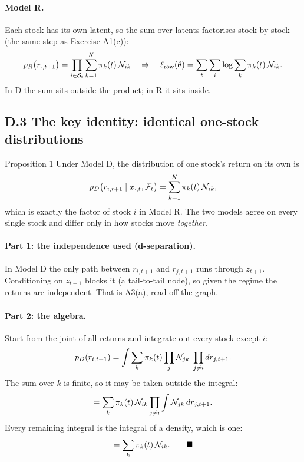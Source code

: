 \paragraph{Model R.} Each stock has its own latent, so the sum over latents factorises stock by stock (the same step as Exercise A1(c)):
\begin{equation}
p_R\big(r_{\cdot,t+1}\big)=\prod_{i\in\mathcal S_t}\sum_{k=1}^K\pi_k(t)\,\mathcal{N}_{ik}
\quad\Rightarrow\quad
\ell_{\text{row}}(\theta)=\sum_t\sum_i\log\sum_k\pi_k(t)\,\mathcal{N}_{ik}.
\end{equation}
In D the sum sits outside the product; in R it sits inside.

\subsection*{D.3 The key identity: identical one-stock distributions}

\begin{keybox}{Proposition 1}
Under Model D, the distribution of one stock's return on its own is
\begin{equation*}
p_D\big(r_{i,t+1}\mid x_{\cdot,t},\mathcal{F}_t\big)=\sum_{k=1}^K\pi_k(t)\,\mathcal{N}_{ik},
\end{equation*}
which is exactly the factor of stock $i$ in Model R. The two models agree on every single stock and differ only in how stocks move \emph{together}.
\end{keybox}

\paragraph{Part 1: the independence used (d-separation).} In Model D the only path between $r_{i,t+1}$ and $r_{j,t+1}$ runs through $z_{t+1}$. Conditioning on $z_{t+1}$ blocks it (a tail-to-tail node), so given the regime the returns are independent. That is A3(a), read off the graph.

\paragraph{Part 2: the algebra.} Start from the joint of all returns and integrate out every stock except $i$:
\begin{equation*}
p_D(r_{i,t+1})=\int\sum_k\pi_k(t)\prod_{j}\mathcal{N}_{jk}\;\prod_{j\ne i}dr_{j,t+1}.
\end{equation*}
The sum over $k$ is finite, so it may be taken outside the integral:
\begin{equation*}
=\sum_k\pi_k(t)\,\mathcal{N}_{ik}\prod_{j\ne i}\int\mathcal{N}_{jk}\,dr_{j,t+1}.
\end{equation*}
Every remaining integral is the integral of a density, which is one:
\begin{equation*}
=\sum_k\pi_k(t)\,\mathcal{N}_{ik}.\qquad\blacksquare
\end{equation*}

